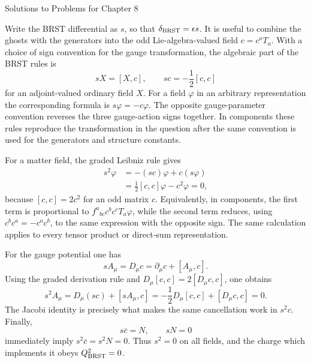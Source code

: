 \begin{bankssolutions}{Solutions to Problems for Chapter 8}

Write the BRST differential as $s$, so that
$\delta_{\rm BRST}=\epsilon s$.  It is useful to combine the ghosts with the
generators into the odd Lie-algebra-valued field $c=c^aT_a$.  With a choice of
sign convention for the gauge transformation, the algebraic part of the BRST
rules is
\[
  sX=[X,c],\qquad sc=-\frac12[c,c]
\]
for an adjoint-valued ordinary field $X$.  For a field $\varphi$ in an
arbitrary representation the corresponding formula is $s\varphi=-c\varphi$.
The opposite gauge-parameter convention reverses the three gauge-action signs
together. In components these rules reproduce the transformation in the
question after the same convention is used for the generators and structure
constants.

For a matter field, the graded Leibniz rule gives
\begin{align*}
  s^2\varphi
    &=-(sc)\varphi+c(s\varphi)\\
    &=\frac12[c,c]\varphi-c^2\varphi=0,
\end{align*}
because $[c,c]=2c^2$ for an odd matrix $c$.  Equivalently, in components,
the first term is proportional to $f^a{}_{bc}c^bc^cT_a\varphi$, while the
second term reduces, using $c^bc^a=-c^ac^b$, to the same expression with the
opposite sign.  The same calculation applies to every tensor product or
direct-sum representation.

For the gauge potential one has
\[
  sA_\mu=D_\mu c=\partial_\mu c+[A_\mu,c].
\]
Using the graded derivation rule and
$D_\mu[c,c]=2[D_\mu c,c]$, one obtains
\[
  s^2A_\mu=D_\mu(sc)+[sA_\mu,c]
  =-\frac12D_\mu[c,c]+[D_\mu c,c]=0.
\]
The Jacobi identity is precisely what makes the same cancellation work in
$s^2c$.  Finally,
\[
  s\bar c=N,\qquad sN=0
\]
immediately imply $s^2\bar c=s^2N=0$.  Thus $s^2=0$ on all fields, and the
charge which implements it obeys $Q_{\rm BRST}^2=0$.


\end{bankssolutions}
